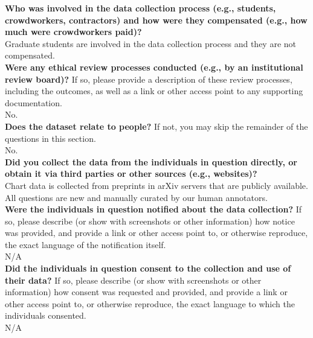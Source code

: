     \textcolor{\sectioncolor}{\textbf{Who was involved in the data collection process (e.g., students,
    crowdworkers, contractors) and how were they compensated (e.g., how much
    were crowdworkers paid)?
    }
    } \\
    Graduate students are involved in the data collection process and they are not compensated. \\
    
    \textcolor{\sectioncolor}{\textbf{Were any ethical review processes conducted (e.g., by an institutional
    review board)?
    }
    If so, please provide a description of these review processes, including
    the outcomes, as well as a link or other access point to any supporting
    documentation.
    } \\
    No. \\
    
    \textcolor{\sectioncolor}{\textbf{Does the dataset relate to people?
    }
    If not, you may skip the remainder of the questions in this section.
    } \\
    No. \\
    
    \textcolor{\sectioncolor}{\textbf{Did you collect the data from the individuals in question directly, or
    obtain it via third parties or other sources (e.g., websites)?
    }
    } \\
    Chart data is collected from preprints in arXiv servers that are publicly available. All questions are new and manually curated by our human annotators.\\
    
    \textcolor{\sectioncolor}{\textbf{Were the individuals in question notified about the data collection?
    }
    If so, please describe (or show with screenshots or other information) how
    notice was provided, and provide a link or other access point to, or
    otherwise reproduce, the exact language of the notification itself.
    } \\
    N/A \\
    
    \textcolor{\sectioncolor}{\textbf{Did the individuals in question consent to the collection and use of their
    data?
    }
    If so, please describe (or show with screenshots or other information) how
    consent was requested and provided, and provide a link or other access
    point to, or otherwise reproduce, the exact language to which the
    individuals consented.
    } \\
    N/A \\
    
